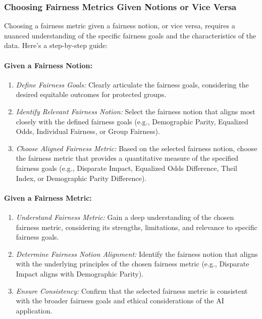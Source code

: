 \subsubsection{Choosing Fairness Metrics Given Notions or Vice Versa}

Choosing a fairness metric given a fairness notion, or vice versa, requires a nuanced understanding of the specific fairness goals and the characteristics of the data. Here's a step-by-step guide:

\paragraph{Given a Fairness Notion:}

\begin{enumerate}
 
    \item \emph{Define Fairness Goals:} Clearly articulate the fairness goals, considering the desired equitable outcomes for protected groups.
 
    \item \emph{Identify Relevant Fairness Notion:} Select the fairness notion that aligns most closely with the defined fairness goals (e.g., Demographic Parity, Equalized Odds, Individual Fairness, or Group Fairness).
 
    \item \emph{Choose Aligned Fairness Metric:} Based on the selected fairness notion, choose the fairness metric that provides a quantitative measure of the specified fairness goals (e.g., Disparate Impact, Equalized Odds Difference, Theil Index, or Demographic Parity Difference).

\end{enumerate}

\paragraph{Given a Fairness Metric:}

\begin{enumerate}

    \item \emph{Understand Fairness Metric:} Gain a deep understanding of the chosen fairness metric, considering its strengths, limitations, and relevance to specific fairness goals.

    \item \emph{Determine Fairness Notion Alignment:} Identify the fairness notion that aligns with the underlying principles of the chosen fairness metric (e.g., Disparate Impact aligns with Demographic Parity).
 
    \item \emph{Ensure Consistency:} Confirm that the selected fairness metric is consistent with the broader fairness goals and ethical considerations of the AI application.

\end{enumerate}

